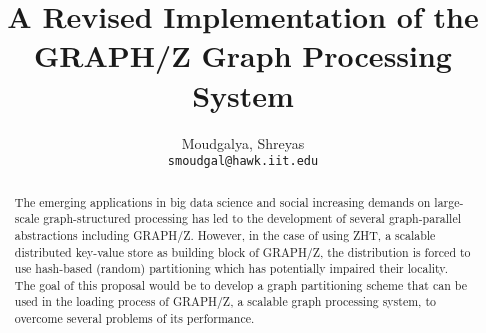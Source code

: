 \documentclass[10pt]{article}
\begin{document}
\nocite{Gz:5}
\nocite{Gz:6}
\nocite{Gz:7}
\nocite{Gz:8}
\nocite{Gz:9}
\nocite{Gz:10}
\nocite{Gz:11}
\nocite{Gz:12}
\title{A Revised Implementation of the GRAPH/Z Graph Processing System}

\author{
  Moudgalya, Shreyas\\
  \texttt{smoudgal@hawk.iit.edu}
}

\maketitle

\begin{abstract}
  The emerging applications in big data science and social increasing demands on large-scale graph-structured processing has led to the development of several graph-parallel abstractions including GRAPH/Z. However, in the case of using ZHT, a scalable distributed key-value store as building block of GRAPH/Z, the distribution is forced to use hash-based (random) partitioning which has potentially impaired their locality. The goal of this proposal would be to develop a graph partitioning scheme that can be used in the loading process of GRAPH/Z, a scalable graph processing system, to overcome several problems of its performance.
\end{abstract}
\end{document}
